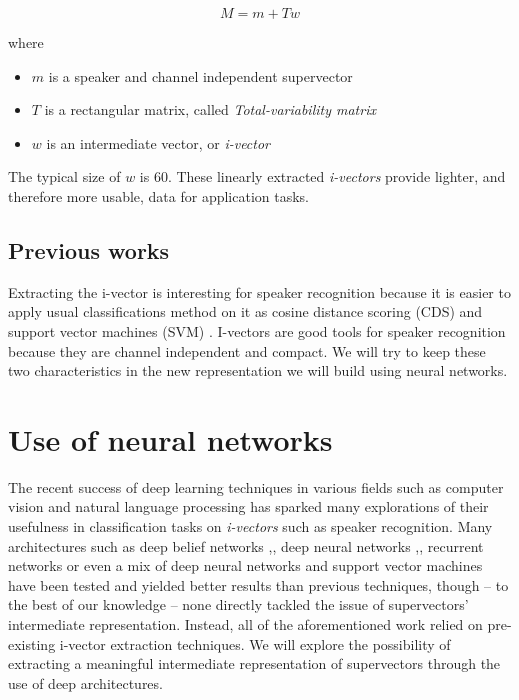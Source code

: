 \documentclass[conference]{IEEEtran}
\begin{document}
\begin{equation}
  M = m + Tw
  \label{eq:i}
\end{equation}

\noindent where
\begin{itemize}
\item $m$ is a speaker and channel independent supervector
\item $T$ is a rectangular matrix, called \emph{Total-variability matrix}
\item $w$ is an intermediate vector, or \emph{i-vector}
\end{itemize}

The typical size of $w$ is $60$. These linearly extracted \emph{i-vectors} provide lighter, and therefore more usable, data for application tasks.

\subsection{Previous works}


Extracting the i-vector is interesting for speaker recognition because it is
easier to apply usual classifications method on it as cosine distance scoring
(CDS) and support vector machines (SVM) \cite{Senoussaoui_ani-vector,
  dehak2011front}. I-vectors are good tools for speaker recognition because they
are channel independent and compact. We will try to keep these two
characteristics in the new representation we will build using neural networks.




\section{Use of neural networks}
\label{sec:Deep}
The recent success of deep learning techniques in various fields such as
computer vision \cite{lecun1998gradient} and natural language processing \cite{bordes2012joint} has sparked
many explorations of their usefulness in classification tasks on
\emph{i-vectors} such as speaker recognition. Many architectures such as deep
belief networks \cite{DBLP:journals/corr/GhahabiH15},\cite{ghahabi2014deep},
deep neural networks \cite{DBLP:journals/corr/GhahabiH15},\cite{ghahabi2014deep}, recurrent
networks \cite{DBLP:journals/corr/SaonSRK16} or even a mix of
deep neural networks and support vector machines \cite{richardson2015deep} have been tested and yielded
better results than previous techniques, though -- to the best of our knowledge --
none directly tackled the issue of supervectors' intermediate representation.
Instead, all of the aforementioned work relied on pre-existing i-vector
extraction techniques. We will explore the possibility of extracting a
meaningful intermediate representation of supervectors through the use of deep architectures.
\end{document}
